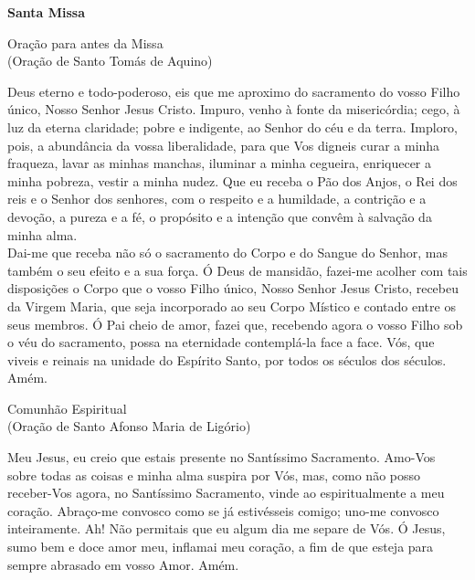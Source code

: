 \documentclass{book}
\begin{document}
\newpage
\begin{center}
    \textbf{Santa Missa}
\end{center}
\begin{center}
    Oração para antes da Missa \\ \textcolor{VioletRed2}{\scriptsize{(Oração de Santo Tomás de Aquino)}}
\end{center}
\begin{flushleft}
    Deus eterno e todo-poderoso, eis que me aproximo do sacramento do vosso Filho único, Nosso Senhor Jesus Cristo. Impuro, venho à fonte da misericórdia; cego, à luz da eterna claridade; pobre e indigente, ao Senhor do céu e da terra. Imploro, pois, a abundância da vossa liberalidade, para que Vos digneis curar a minha fraqueza, lavar as minhas manchas, iluminar a minha cegueira, enriquecer a minha pobreza, vestir a minha nudez. Que eu receba o Pão dos Anjos, o Rei dos reis e o Senhor dos senhores, com o respeito e a humildade, a contrição e a devoção, a pureza e a fé, o propósito e a intenção que convêm à salvação da minha alma.
    \vspace{.2cm} \\
    Dai-me que receba não só o sacramento do Corpo e do Sangue do Senhor, mas também o seu efeito e a sua força. Ó Deus de mansidão, fazei-me acolher com tais disposições o Corpo que o vosso Filho único, Nosso Senhor Jesus Cristo, recebeu da Virgem Maria, que seja incorporado ao seu Corpo Místico e contado entre os seus membros. Ó Pai cheio de amor, fazei que, recebendo agora o vosso Filho sob o véu do sacramento, possa na eternidade contemplá-la face a face. Vós, que viveis e reinais na unidade do Espírito Santo, por todos os séculos dos séculos. Amém.
\end{flushleft}
\begin{center}
    Comunhão Espiritual \\ \textcolor{VioletRed2}{\scriptsize{(Oração de Santo Afonso Maria de Ligório)}}
\end{center}
\begin{flushleft}
    Meu Jesus, eu creio que estais presente no Santíssimo Sacramento. Amo-Vos sobre todas as coisas e minha alma suspira por Vós, mas, como não posso receber-Vos agora, no Santíssimo Sacramento, vinde ao espiritualmente a meu coração. Abraço-me convosco como se já estivésseis comigo; uno-me convosco inteiramente. Ah! Não permitais que eu algum dia me separe de Vós. Ó Jesus, sumo bem e doce amor meu, inflamai meu coração, a fim de que esteja para sempre abrasado em vosso Amor. Amém.
\end{flushleft}
\end{document}
